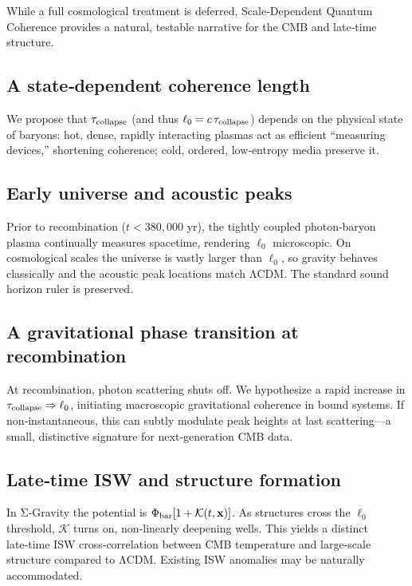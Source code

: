 \documentclass[11pt,a4paper]{article}
\begin{document}
While a full cosmological treatment is deferred, Scale‑Dependent Quantum Coherence provides a natural, testable narrative for the CMB and late‑time structure.


\subsection{A state‑dependent coherence length}


We propose that $\tau_{\rm collapse}$ (and thus $\ell_0=c\,\tau_{\rm collapse}$) depends on the physical state of baryons: hot, dense, rapidly interacting plasmas act as efficient “measuring devices,” shortening coherence; cold, ordered, low‑entropy media preserve it.


\subsection{Early universe and acoustic peaks}


Prior to recombination ($t<380{,}000$ yr), the tightly coupled photon‑baryon plasma continually measures spacetime, rendering $\ell_0$ microscopic. On cosmological scales the universe is vastly larger than $\ell_0$, so gravity behaves classically and the acoustic peak locations match ΛCDM. The standard sound horizon ruler is preserved.


\subsection{A gravitational phase transition at recombination}


At recombination, photon scattering shuts off. We hypothesize a rapid increase in $\tau_{\rm collapse}\Rightarrow\ell_0$, initiating macroscopic gravitational coherence in bound systems. If non‑instantaneous, this can subtly modulate peak heights at last scattering—a small, distinctive signature for next‑generation CMB data.


\subsection{Late‑time ISW and structure formation}


In Σ‑Gravity the potential is $\Phi_{\rm bar}[1+\mathcal{K}(t,\mathbf{x})]$. As structures cross the $\ell_0$ threshold, $\mathcal{K}$ turns on, non‑linearly deepening wells. This yields a distinct late‑time ISW cross‑correlation between CMB temperature and large‑scale structure compared to ΛCDM. Existing ISW anomalies may be naturally accommodated.
\end{document}

